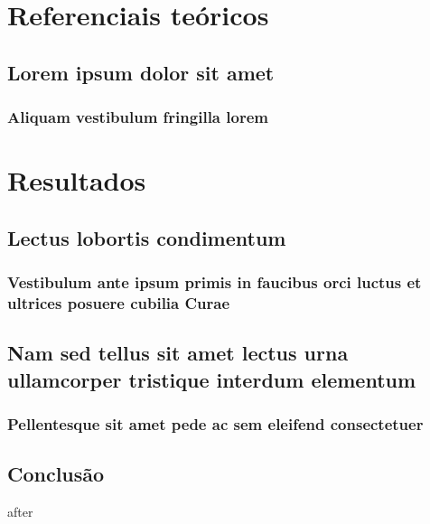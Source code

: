 \documentclass[
    12pt,
openright,             %
    twoside,               %
    a4paper,
french,            %
ngerman,           %
spanish,           %
brazil,            %
british,           %
    ]{abntex2}
\begin{document}
\part{Referenciais teóricos}

\chapter{Lorem ipsum dolor sit amet}

\section{Aliquam vestibulum fringilla lorem}

\lipsum[1]

\lipsum[2-3]

\part{Resultados}

\chapter{Lectus lobortis condimentum}

\section{Vestibulum ante ipsum primis in faucibus orci luctus et ultrices
posuere cubilia Curae}

\lipsum[21-22]

\chapter{Nam sed tellus sit amet lectus urna ullamcorper tristique interdum
elementum}

\section{Pellentesque sit amet pede ac sem eleifend consectetuer}

\lipsum[24]


\chapter{Conclusão}

\lipsum[31-33]

\postextual  %
{after}
\end{document}
